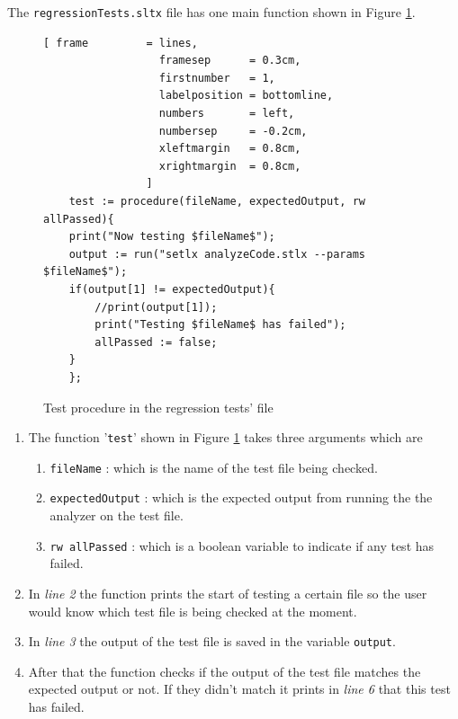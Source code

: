 \documentclass[11pt]{report}
\begin{document}
The \texttt{regressionTests.sltx} file has one main function shown in Figure \ref{fig:regressionTests.stlx}.

\begin{figure}[!ht]
\centering
\begin{Verbatim}[ frame         = lines, 
                  framesep      = 0.3cm, 
                  firstnumber   = 1,
                  labelposition = bottomline,
                  numbers       = left,
                  numbersep     = -0.2cm,
                  xleftmargin   = 0.8cm,
                  xrightmargin  = 0.8cm,
                ]
    test := procedure(fileName, expectedOutput, rw allPassed){
	print("Now testing $fileName$");
	output := run("setlx analyzeCode.stlx --params $fileName$");
	if(output[1] != expectedOutput){
		//print(output[1]);
		print("Testing $fileName$ has failed");
		allPassed := false;
	}
    };
\end{Verbatim}
\vspace*{-0.3cm}
\caption{Test procedure in the regression tests' file}
\label{fig:regressionTests.stlx}
\end{figure}

\begin{enumerate}
\item The function '\texttt{test}' shown in Figure \ref{fig:regressionTests.stlx} takes three arguments which are 
	\begin{enumerate}
	\item \texttt{fileName} : which is the name of the 			test file being checked.
	\item \texttt{expectedOutput} : which is the expected 	output from running the the analyzer on the test 			file.
	\item \texttt{rw allPassed} : which is a boolean 			variable to indicate if any test has failed.
	\end{enumerate}

\item In \textsl{line 2} the function prints the start of testing a certain file so the user would know which test file is being checked at the moment.

\item In \textsl{line 3} the output of the test file is saved in the variable \texttt{output}.

\item After that the function checks if the output of the test file matches the expected output or not. If they didn't match it prints in \textsl{line 6} that this test has failed.
\end{enumerate}
\end{document}
